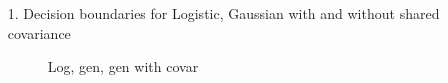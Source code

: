 \documentclass[submit]{harvardml}
\newenvironment{answer}{%
    \color{answergreen}\bf}
  {%
  }
\begin{document}
\newpage
\begin{enumerate}
    \item[1.] Decision boundaries for Logistic, Gaussian with and without shared
        covariance
    \begin{answer}
            \begin{figure}[H]
            \centering 
            \hfil %

                \caption{Log, gen, gen with covar}
            \label{fig:myfig}
            \end{figure}


\end{answer}
\end{enumerate}
\end{document}
